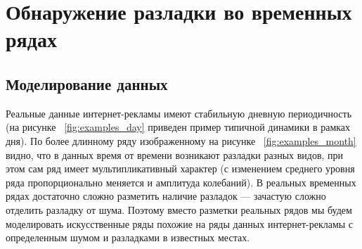 \documentclass[%
12pt,
master,  %
natbib,      %
subf,        %
substylefile = spbu.rtx,
href,        %
colorlinks,  %
]{disser}
\begin{document}
%
%
%


\chapter{Обнаружение разладки во временных рядах}

\section{Моделирование данных}\label{section:data_modeling}

Реальные данные интернет-рекламы имеют стабильную дневную периодичность (на рисунке ~\ref{fig:examples_day} приведен пример типичной динамики в рамках дня). По более длинному ряду изображенному на рисунке ~\ref{fig:examples_month} видно, что в данных время от времени возникают разладки разных видов, при этом сам ряд имеет мультипликативный характер (с изменением среднего уровня ряда пропорционально меняется и амплитуда колебаний). В реальных временных рядах достаточно сложно разметить наличие разладок --- зачастую сложно отделить разладку от шума. Поэтому вместо разметки реальных рядов мы будем моделировать искусственные ряды похожие на ряды данных интернет-рекламы с определенным шумом и разладками в известных местах.
\end{document}
